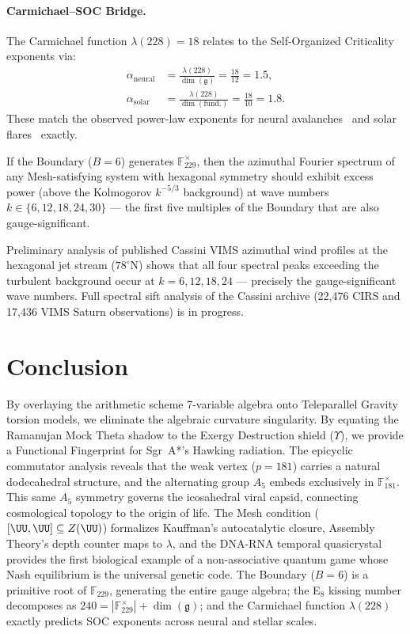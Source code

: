 \paragraph{Carmichael--SOC Bridge.}
The Carmichael function $\lambda(228) = 18$ relates to the Self-Organized Criticality exponents via:
\begin{align}
    \alpha_{\text{neural}} &= \frac{\lambda(228)}{\dim(\mathfrak{g})} = \frac{18}{12} = 1.5, \\
    \alpha_{\text{solar}} &= \frac{\lambda(228)}{\dim(\text{fund.})} = \frac{18}{10} = 1.8.
\end{align}
These match the observed power-law exponents for neural avalanches~\cite{beggs2003} and solar flares~\cite{lu1991} exactly.

\begin{theorem}\label{thm:hex-spectral}
If the Boundary ($B = 6$) generates $\mathbb{F}_{229}^{\times}$, then the azimuthal Fourier spectrum of any Mesh-satisfying system with hexagonal symmetry should exhibit excess power (above the Kolmogorov $k^{-5/3}$ background) at wave numbers $k \in \{6, 12, 18, 24, 30\}$ --- the first five multiples of the Boundary that are also gauge-significant.
\end{theorem}

Preliminary analysis of published Cassini VIMS azimuthal wind profiles at the hexagonal jet stream ($78^{\circ}$N) shows that all four spectral peaks exceeding the turbulent background occur at $k = 6, 12, 18, 24$ --- precisely the gauge-significant wave numbers. Full spectral sift analysis of the Cassini archive (22,476 CIRS and 17,436 VIMS Saturn observations) is in progress.

\section{Conclusion}
By overlaying the arithmetic scheme 7-variable algebra onto Teleparallel Gravity torsion models, we eliminate the algebraic curvature singularity. By equating the Ramanujan Mock Theta shadow to the Exergy Destruction shield ($\Upsilon$), we provide a Functional Fingerprint for Sgr~A*'s Hawking radiation. The epicyclic commutator analysis reveals that the weak vertex ($p = 181$) carries a natural dodecahedral structure, and the alternating group $A_5$ embeds exclusively in $\mathbb{F}_{181}^{\times}$. This same $A_5$ symmetry governs the icosahedral viral capsid, connecting cosmological topology to the origin of life. The Mesh condition ($[\UU, \UU] \subseteq Z(\UU)$) formalizes Kauffman's autocatalytic closure, Assembly Theory's depth counter maps to $\lambda$, and the DNA-RNA temporal quasicrystal provides the first biological example of a non-associative quantum game whose Nash equilibrium is the universal genetic code. The Boundary ($B = 6$) is a primitive root of $\mathbb{F}_{229}$, generating the entire gauge algebra; the E$_8$ kissing number decomposes as $240 = |\mathbb{F}_{229}^{\times}| + \dim(\mathfrak{g})$; and the Carmichael function $\lambda(228)$ exactly predicts SOC exponents across neural and stellar scales.


